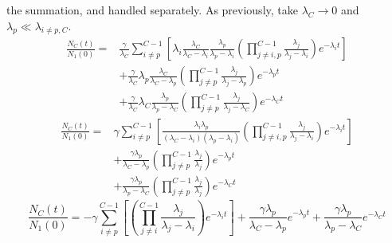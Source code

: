 \documentclass[letterpaper]{physor2018}
\begin{document}
the summation, and handled separately. As previously, take $\lambda_C \to 0$ and
$\lambda_p \ll \lambda_{i\ne p,C}$.
\begin{equation}
\label{last-stable-and-almost-stable-0}
\begin{split}
   \frac{N_C(t)}{N_1(0)} = & \frac{\gamma}{\lambda_C}\sum_{i\ne p}^{C-1} \left[\lambda_i \frac{\lambda_C}{\lambda_C - \lambda_i} \frac{\lambda_p}{\lambda_p - \lambda_i}
                                                        \left(\prod_{j\ne i,p}^{C-1} \frac{\lambda_j}{\lambda_j - \lambda_i}\right)
                                                        e^{-\lambda_i t}\right] \\
                           & + \frac{\gamma}{\lambda_C} \lambda_p \frac{\lambda_C}{\lambda_C - \lambda_p} \left(\prod_{j\ne p}^{C-1} \frac{\lambda_j}{\lambda_j - \lambda_p} \right) e^{-\lambda_p t} \\
                           & + \frac{\gamma}{\lambda_C} \lambda_C \frac{\lambda_p}{\lambda_p - \lambda_C} \left(\prod_{j\ne p}^{C-1} \frac{\lambda_j}{\lambda_j - \lambda_C} \right) e^{-\lambda_C t}
\end{split}
\end{equation}
\begin{equation}
\label{last-stable-and-almost-stable-1}
\begin{split}
   \frac{N_C(t)}{N_1(0)} = & \gamma\sum_{i\ne p}^{C-1} \left[\frac{\lambda_i \lambda_p}{(\lambda_C - \lambda_i)(\lambda_p - \lambda_i)}
                                                        \left(\prod_{j\ne i,p}^{C-1} \frac{\lambda_j}{\lambda_j - \lambda_i}\right)
                                                        e^{-\lambda_i t}\right] \\
                           & + \frac{\gamma\lambda_p}{\lambda_C - \lambda_p} \left(\prod_{j\ne p}^{C-1} \frac{\lambda_j}{\lambda_j} \right) e^{-\lambda_p t}\\
                           & + \frac{\gamma\lambda_p}{\lambda_p - \lambda_C} \left(\prod_{j\ne p}^{C-1} \frac{\lambda_j}{\lambda_j} \right) e^{-\lambda_C t}
\end{split}
\end{equation}
\begin{equation}
\label{last-stable-and-almost-stable-2}
   \frac{N_C(t)}{N_1(0)} = -\gamma\sum_{i\ne p}^{C-1} \left[\left(\prod_{j\ne i}^{C-1} \frac{\lambda_j}{\lambda_j - \lambda_i}\right) e^{-\lambda_i t}\right]
                           + \frac{\gamma\lambda_p}{\lambda_C - \lambda_p} e^{-\lambda_p t}
                           + \frac{\gamma\lambda_p}{\lambda_p - \lambda_C} e^{-\lambda_C t}
\end{equation}
\end{document}
